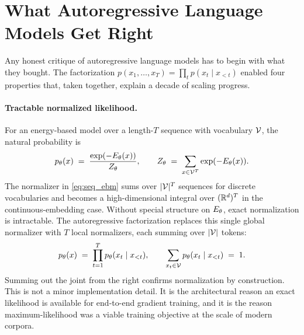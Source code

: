
\section{What Autoregressive Language Models Get Right}
\label{sec:advantages}

Any honest critique of autoregressive language models has to begin with what they bought.
The factorization $p(x_1, \ldots, x_T) = \prod_t p(x_t \mid x_{<t})$ enabled four properties that, taken together, explain a decade of scaling progress.

\paragraph{Tractable normalized likelihood.}
For an energy-based model over a length-$T$ sequence with vocabulary $\mathcal{V}$, the natural probability is
\begin{equation}
  p_\theta(x) \;=\; \frac{\exp(-E_\theta(x))}{Z_\theta}, \qquad
  Z_\theta \;=\; \sum_{x \in \mathcal{V}^T} \exp(-E_\theta(x)).
  \label{eq:seq_ebm}
\end{equation}
The normalizer in \cref{eq:seq_ebm} sums over $|\mathcal{V}|^T$ sequences for discrete vocabularies and becomes a high-dimensional integral over $(\mathbb{R}^d)^T$ in the continuous-embedding case.
Without special structure on $E_\theta$, exact normalization is intractable.
The autoregressive factorization replaces this single global normalizer with $T$ local normalizers, each summing over $|\mathcal{V}|$ tokens:
\begin{equation}
  p_\theta(x) \;=\; \prod_{t=1}^{T} p_\theta(x_t \mid x_{<t}), \qquad
  \sum_{x_t \in \mathcal{V}} p_\theta(x_t \mid x_{<t}) \;=\; 1.
  \label{eq:ar_factorization}
\end{equation}
Summing out the joint from the right confirms normalization by construction.
This is not a minor implementation detail.
It is the architectural reason an exact likelihood is available for end-to-end gradient training, and it is the reason maximum-likelihood was a viable training objective at the scale of modern corpora.

